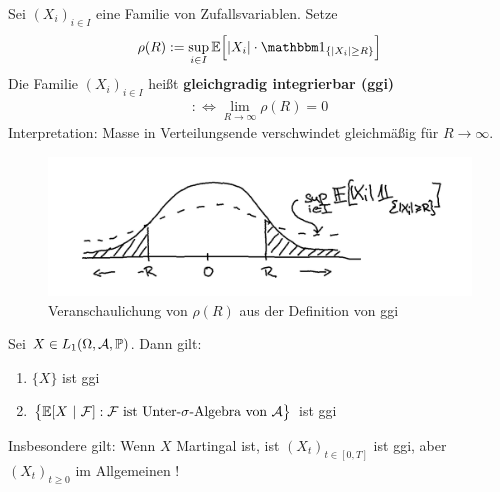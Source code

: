 \begin{defi}
	Sei $(X_i)_{i\in I}$ eine Familie von Zufallsvariablen. Setze
	\begin{align*}
		\rho(R):=\sup\limits_{i\in I}\E\Big[|X_i|\cdot\indi_{\lbrace |X_i|\geq R\rbrace}\Big]
	\end{align*}
	Die Familie $(X_i)_{i\in I}$ heißt \textbf{gleichgradig integrierbar (ggi)}
	\begin{align*}
		:\Longleftrightarrow\lim\limits_{R\to\infty}\rho(R)=0
	\end{align*}
	Interpretation: Masse in Verteilungsende verschwindet gleichmäßig für $R\to\infty$.
	\begin{figure}[!ht]
		\begin{center}
			\includegraphics[width=\textwidth]{pics/Sketch3.png}
			\caption{Veranschaulichung von $\rho(R)$ aus der Definition von ggi}
			\label{AbbRhoGGI}
		\end{center}
	\end{figure}
\end{defi}

\setcounter{satz}{2}
\begin{lemma}\label{lemma4.3}
	Sei $X\in L_1(\Omega,\mathcal{A},\mathbb{P})$. Dann gilt:
	\begin{enumerate}[label=(\alph*)]
		\item $\lbrace X\rbrace$ ist ggi
		\item $\big\lbrace\mathbb{E}[X~|~\mathcal{F}]:\mathcal{F}\text{ ist Unter-$\sigma$-Algebra von }\mathcal{A}\big\rbrace$ ist ggi
	\end{enumerate}
\end{lemma}

\begin{bemerkung}
	Insbesondere gilt: Wenn $X$ Martingal ist, ist $(X_t)_{t\in[0,T]}$ ist ggi, aber $(X_t)_{t\geq0}$ im Allgemeinen !
\end{bemerkung}

